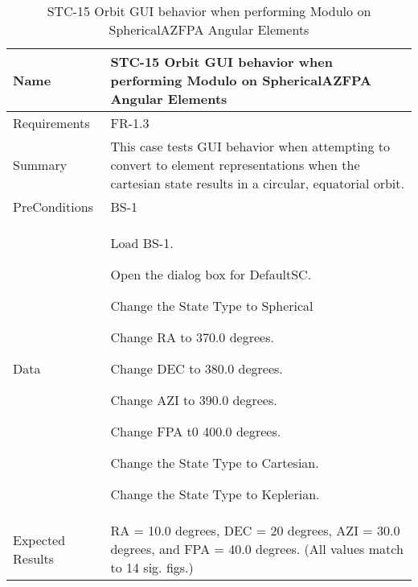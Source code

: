 
\begin{table}[htbp!]
\centering
      \begin{tabular}{|p{1.05 in} |p{4.75 in} |}
      \hline
         \rowcolor[rgb]{0.8,0.8,0.8} Name & STC-15 Orbit GUI behavior when performing Modulo on SphericalAZFPA Angular Elements\\
         \hline
         Requirements & FR-1.3\\  \hline
         Summary &
         This  case tests GUI behavior when attempting to convert to element representations when the
         cartesian state results in a circular, equatorial orbit.
         \\     \hline
         PreConditions & BS-1\\     \hline
         Data &
         \begin{compactenum}
             \item Load BS-1.
             \item Open the dialog box for DefaultSC.
             \item Change the State Type to Spherical
             \item Change RA to 370.0 degrees.
             \item Change DEC to 380.0 degrees.
             \item Change AZI to 390.0 degrees.
             \item Change FPA t0 400.0 degrees.
             \item Change the State Type to Cartesian.
             \item Change the State Type to Keplerian.
         \end{compactenum}
         \\ \hline
         Expected Results & RA = 10.0 degrees, DEC = 20 degrees, AZI = 30.0 degrees, and FPA = 40.0 degrees. (All
         values match to 14 sig. figs.)\\
      \hline
      \end{tabular}
      \label{Table:STC-15}
      \caption{STC-15 Orbit GUI behavior when performing Modulo on SphericalAZFPA Angular Elements}
\end{table} 